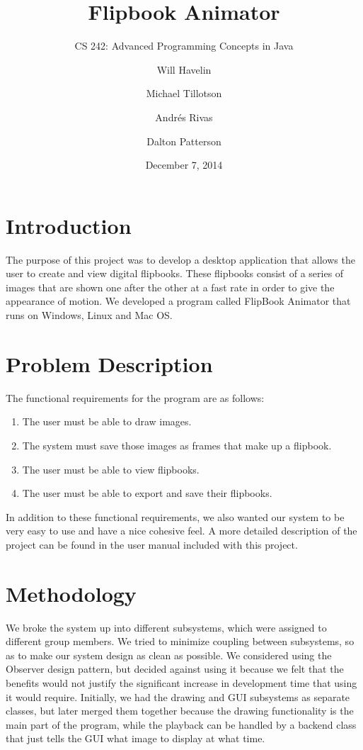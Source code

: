 \documentclass[10 pt]{scrartcl}
\title{Flipbook Animator}
\subtitle{CS 242: Advanced Programming Concepts in Java}
\author{Will Havelin \and Michael Tillotson \and Andr\'{e}s Rivas \and Dalton Patterson}
\date{December 7, 2014}
\begin{document}
\maketitle

\section{Introduction}

The purpose of this project was to develop a desktop application that allows the user to create and view digital flipbooks. These flipbooks consist of a series of images that are shown one after the other at a fast rate in order to give the appearance of motion. We developed a program called FlipBook Animator that runs on Windows, Linux and Mac OS.

\section{Problem Description}

The functional requirements for the program are as follows:
\begin{enumerate}
    \item The user must be able to draw images.
    \item The system must save those images as frames that make up a flipbook.
    \item The user must be able to view flipbooks.
    \item The user must be able to export and save their flipbooks.
\end{enumerate}
In addition to these functional requirements, we also wanted our system to be very easy to use and have a nice cohesive feel. A more detailed description of the project can be found in the user manual included with this project.

\section{Methodology}

We broke the system up into different subsystems, which were assigned to different group members. We tried to minimize coupling between subsystems, so as to make our system design as clean as possible. We considered using the Observer design pattern, but decided against using it because we felt that the benefits would not justify the significant increase in development time that using it would require. Initially, we had the drawing and GUI subsystems as separate classes, but later merged them together because the drawing functionality is the main part of the program, while the playback can be handled by a backend class that just tells the GUI what image to display at what time.
\end{document}
